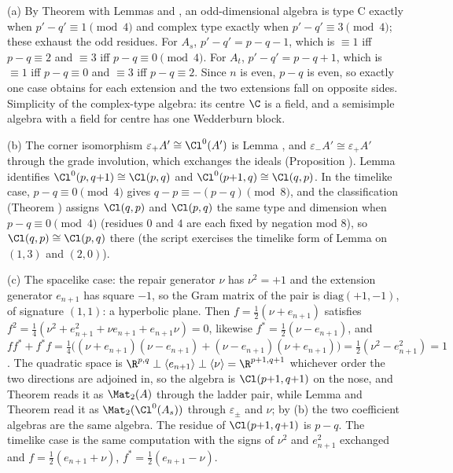 (a) By Theorem  with Lemmas  and , an odd-dimensional algebra is type C exactly when $p' - q' \equiv 1 \pmod 4$ and complex type exactly when $p' - q' \equiv 3 \pmod 4$; these exhaust the odd residues. For $A_s$, $p' - q' = p - q - 1$, which is $\equiv 1$ iff $p - q \equiv 2$ and $\equiv 3$ iff $p - q \equiv 0 \pmod 4$. For $A_t$, $p' - q' = p - q + 1$, which is $\equiv 1$ iff $p - q \equiv 0$ and $\equiv 3$ iff $p - q \equiv 2$. Since $n$ is even, $p - q$ is even, so exactly one case obtains for each extension and the two extensions fall on opposite sides. Simplicity of the complex-type algebra: its centre $\C$ is a field, and a semisimple algebra with a field for centre has one Wedderburn block.

(b) The corner isomorphism $\varepsilon_+ A' \cong \Cl^0(A')$ is Lemma , and $\varepsilon_- A' \cong \varepsilon_+ A'$ through the grade involution, which exchanges the ideals (Proposition ). Lemma  identifies $\Cl^0(p,q{+}1) \cong \Cl(p,q)$ and $\Cl^0(p{+}1,q) \cong \Cl(q,p)$. In the timelike case, $p - q \equiv 0 \pmod 4$ gives $q - p \equiv -(p-q) \pmod 8$, and the classification (Theorem ) assigns $\Cl(q,p)$ and $\Cl(p,q)$ the same type and dimension when $p - q \equiv 0 \pmod 4$ (residues $0$ and $4$ are each fixed by negation mod 8), so $\Cl(q,p) \cong \Cl(p,q)$ there (the script exercises the timelike form of Lemma  on $(1,3)$ and $(2,0)$).

(c) The spacelike case: the repair generator $\nu$ has $\nu^2 = +1$ and the extension generator $e_{n+1}$ has square $-1$, so the Gram matrix of the pair is $\mathrm{diag}(+1,-1)$, of signature $(1,1)$: a hyperbolic plane. Then $f = \tfrac12(\nu + e_{n+1})$ satisfies $f^2 = \tfrac14(\nu^2 + e_{n+1}^2 + \nu e_{n+1} + e_{n+1}\nu) = 0$, likewise $f^* = \tfrac12(\nu - e_{n+1})$, and $ff^* + f^*f = \tfrac14\bigl((\nu + e_{n+1})(\nu - e_{n+1}) + (\nu - e_{n+1})(\nu + e_{n+1})\bigr) = \tfrac12(\nu^2 - e_{n+1}^2) = 1$. The quadratic space is $\R^{p,q} \perp \langle e_{n+1}\rangle \perp \langle \nu \rangle = \R^{p+1,q+1}$ whichever order the two directions are adjoined in, so the algebra is $\Cl(p{+}1,q{+}1)$ on the nose, and Theorem  reads it as $\Mat_2(A)$ through the ladder pair, while Lemma  and Theorem  read it as $\Mat_2(\Cl^0(A_s))$ through $\varepsilon_\pm$ and $\nu$; by (b) the two coefficient algebras are the same algebra. The residue of $\Cl(p{+}1,q{+}1)$ is $p - q$. The timelike case is the same computation with the signs of $\nu^2$ and $e_{n+1}^2$ exchanged and $f = \tfrac12(e_{n+1} + \nu)$, $f^* = \tfrac12(e_{n+1} - \nu)$.

